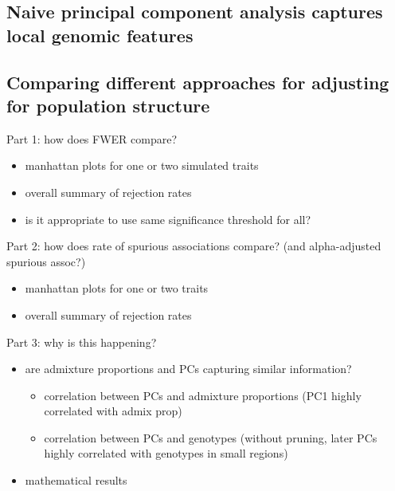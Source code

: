 \documentclass[12pt]{article}
\begin{document}
\subsection{Naive principal component analysis captures local genomic features} 

%

\subsection{Comparing different approaches for adjusting for population structure}

Part 1: how does FWER compare?

\begin{itemize}
\item manhattan plots for one or two simulated traits
\item overall summary of rejection rates
\item is it appropriate to use same significance threshold for all?
\end{itemize}

\noindent Part 2: how does rate of spurious associations compare? (and alpha-adjusted spurious assoc?)

\begin{itemize}
\item manhattan plots for one or two traits
\item overall summary of rejection rates
\end{itemize}

\noindent Part 3: why is this happening?

\begin{itemize}
\item are admixture proportions and PCs capturing similar information?
	\begin{itemize}
	\item correlation between PCs and admixture proportions (PC1 highly correlated with admix prop)
	\item correlation between PCs and genotypes (without pruning, later PCs highly correlated with genotypes in small regions)
	\end{itemize}
\item mathematical results
\end{itemize}
\end{document}
